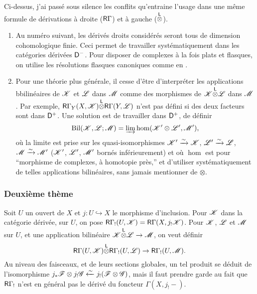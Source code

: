 Ci-dessus, j'ai pass\'e sous silence les conflits qu'entraine l'usage dans une 
m\^eme formule de d\'erivations \`a droite ($\mathsf{R}\Gamma$) et \`a gauche 
(${\overset{\mathsf{L}}{\otimes}}$). 
\begin{enumerate}[\indent a)]
  \item Au num\'ero suivant, les d\'eriv\'es droits consid\'er\'es seront tous 
    de dimension cohomologique finie. Ceci permet de travailler 
    syst\'ematiquement dans les cat\'egories d\'eriv\'ees $\mathsf{D}^-$. Pour disposer 
    de complexes \`a la fois plats et flasques, on utilise les r\'esolutions 
    flasques canoniques comme en \cite[XVII]{sga4}. 
  \item Pour une th\'eorie plus g\'en\'erale, il cesse d'être d'interpr\'eter 
    les applications bbilin\'eaires de $\mathscr{K}$ et $\mathscr{L}$ dans $\mathscr{M}$ comme des 
    morphismes de $\mathscr{K}{\overset{\mathsf{L}}{\otimes}}\mathscr{L}$ dans $\mathscr{M}$. Par exemple, 
    $\mathsf{R}\Gamma_Y(X,\mathscr{K}){\overset{\mathsf{L}}{\otimes}}\mathsf{R}\Gamma(Y,\mathscr{L})$ n'est pas d\'efini si des deux 
    facteurs sont dans $\mathsf{D}^+$. Une solution est de travailler dans $\mathsf{D}^+$, de 
    d\'efinir 
    \[
      \operatorname{Bil}(\mathscr{K},\mathscr{L};\mathscr{M}) = \varinjlim \hom(\mathscr{K}'\otimes\mathscr{L}',\mathscr{M}') \text{,}
    \]
    o\`u la limite est prise sur les quasi-isomorphismes $\mathscr{K}'\xrightarrow\sim \mathscr{K}$, 
    $\mathscr{L}'\xrightarrow\sim \mathscr{L}$, $\mathscr{M}\xrightarrow\sim \mathscr{M}'$ ($\mathscr{K}'$, $\mathscr{L}'$, $\mathscr{M}'$ born\'es 
    inf\'erieurement) et o\`u $\hom$ est pour ``morphisme de complexes, \`a 
    homotopie pr\`es,'' et d'utiliser syst\'ematiquement de telles applications 
    bilin\'eaires, sans jamais mentionner de $\otimes$.  
\end{enumerate}




\subsubsection{Deuxi\`eme thème}\label{IV:1-2-4}

Soit $U$ un ouvert de $X$ et $j:U\hookrightarrow X$ le morphisme d'inclusion. 
Pour $\mathscr{K}$ dans la cat\'egorie d\'eriv\'ee, sur $U$, on pose 
$\mathsf{R}\Gamma_!(U,\mathscr{K})=\mathsf{R}\Gamma(X,j_!\mathscr{K})$. Pour $\mathscr{K}$, $\mathscr{L}$ et $\mathscr{M}$ sur $U$, et 
une application bilin\'eaire $\mathscr{K}{\overset{\mathsf{L}}{\otimes}}\mathscr{L}\to\mathscr{M}$, on veut d\'efinir 
\begin{equation}\label{IV:eq:1-2-4-1}
  \mathsf{R}\Gamma(U,\mathscr{K}){\overset{\mathsf{L}}{\otimes}}\mathsf{R}\Gamma_!(U,\mathscr{L})\to\mathsf{R}\Gamma_!(U,\mathscr{M}) \text{.}
\end{equation}
Au niveau des faisceaux, et de leurs sections globales, un tel produit se 
d\'eduit de l'isomorphisme 
$j_*\mathscr{F}\otimes j_!\mathscr{G}\xleftarrow\sim j_!(\mathscr{F}\otimes \mathscr{G})$, mais il faut prendre 
garde au fait que $\mathsf{R}\Gamma_!$ n'est en g\'en\'eral pas le d\'eriv\'e du 
foncteur $\Gamma(X,j_!-)$. 

